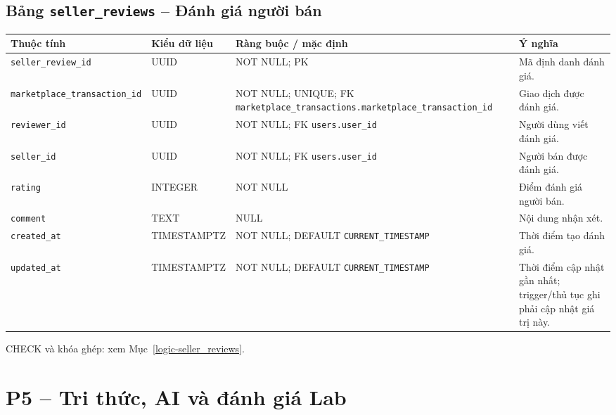 \subsection{Bảng \texttt{seller\_\allowbreak{}reviews} -- Đánh giá người bán}
\label{dictionary-seller_reviews}
\begingroup
\footnotesize
\setlength{\tabcolsep}{3pt}
\begin{longtable}{>{\raggedright\arraybackslash}p{3.1cm}>{\raggedright\arraybackslash}p{2.5cm}>{\raggedright\arraybackslash}p{3.7cm}>{\raggedright\arraybackslash}p{4.3cm}}
\toprule
Thuộc tính & Kiểu dữ liệu & Ràng buộc / mặc định & Ý nghĩa \\
\midrule
\endhead
\texttt{seller\_\allowbreak{}review\_\allowbreak{}id} & UUID & NOT NULL; PK & Mã định danh đánh giá. \\
\texttt{marketplace\_\allowbreak{}transaction\_\allowbreak{}id} & UUID & NOT NULL; UNIQUE; FK \texttt{marketplace\_\allowbreak{}transactions.marketplace\_\allowbreak{}transaction\_\allowbreak{}id} & Giao dịch được đánh giá. \\
\texttt{reviewer\_\allowbreak{}id} & UUID & NOT NULL; FK \texttt{users.user\_\allowbreak{}id} & Người dùng viết đánh giá. \\
\texttt{seller\_\allowbreak{}id} & UUID & NOT NULL; FK \texttt{users.user\_\allowbreak{}id} & Người bán được đánh giá. \\
\texttt{rating} & INTEGER & NOT NULL & Điểm đánh giá người bán. \\
\texttt{comment} & TEXT & NULL & Nội dung nhận xét. \\
\texttt{created\_\allowbreak{}at} & TIMESTAMPTZ & NOT NULL; DEFAULT \texttt{CURRENT\_\allowbreak{}TIMESTAMP} & Thời điểm tạo đánh giá. \\
\texttt{updated\_\allowbreak{}at} & TIMESTAMPTZ & NOT NULL; DEFAULT \texttt{CURRENT\_\allowbreak{}TIMESTAMP} & Thời điểm cập nhật gần nhất; trigger/thủ tục ghi phải cập nhật giá trị này. \\
\bottomrule
\end{longtable}
\endgroup
CHECK và khóa ghép: xem Mục~\ref{logic-seller_reviews}.
\section{P5 -- Tri thức, AI và đánh giá Lab}
